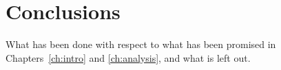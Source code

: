 \chapter{Conclusions}\label{ch:conclusions}

What has been done with respect to what has been promised in Chapters~\ref{ch:intro} and \ref{ch:analysis}, and what is left out.
